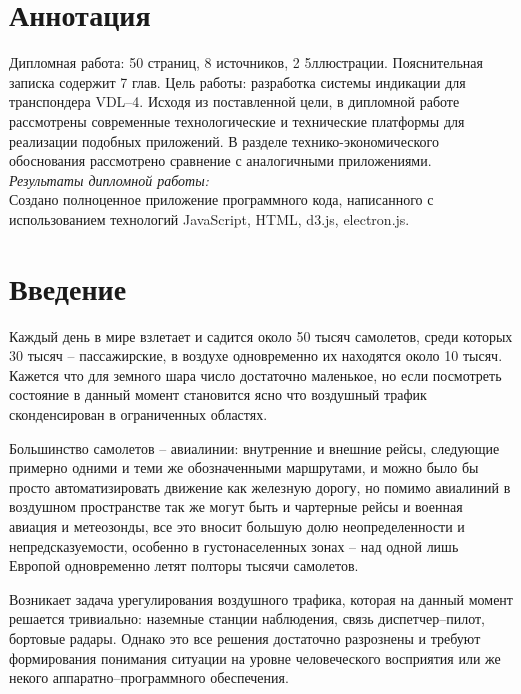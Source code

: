 \documentclass[a4paper,12pt]{report} %
\begin{document}
\setcounter{page}{5}
\chapter*{Аннотация}

Дипломная работа: 50 страниц, 8 источников, 2 5ллюстрации. Пояснительная записка
содержит 7 глав. Цель работы: разработка системы индикации для транспондера
VDL--4. Исходя из поставленной цели, в дипломной работе рассмотрены современные
технологические и технические платформы для реализации подобных приложений. В
разделе технико-экономического обоснования рассмотрено сравнение с аналогичными
приложениями.
\\

\textit{Результаты дипломной работы:}
\\
Создано полноценное приложение программного кода, написанного с использованием
технологий JavaScript, HTML, d3.js, electron.js.

\tableofcontents

\setlength{\parskip}{1em}
\chapter*{Введение} %

Каждый день в мире взлетает и садится около 50 тысяч самолетов, среди
которых 30 тысяч -- пассажирские, в воздухе одновременно их находятся около 10
тысяч. Кажется что для земного шара число достаточно маленькое, но если
посмотреть состояние в данный момент становится ясно что воздушный трафик
сконденсирован в ограниченных областях.

Большинство самолетов -- авиалинии: внутренние и внешние рейсы, следующие
примерно одними и теми же обозначенными маршрутами, и можно было бы просто
автоматизировать движение как железную дорогу, но помимо авиалиний в воздушном
пространстве так же могут быть и чартерные рейсы и военная авиация и метеозонды,
все это вносит большую долю неопределенности и непредсказуемости, особенно в
густонаселенных зонах -- над одной лишь Европой одновременно летят полторы тысячи
самолетов.

Возникает задача урегулирования воздушного трафика, которая на данный момент
решается тривиально: наземные станции наблюдения, связь диспетчер--пилот,
бортовые радары. Однако это все решения достаточно разрознены и требуют
формирования понимания ситуации на уровне человеческого восприятия или же некого
аппаратно--программного обеспечения.
\end{document}
